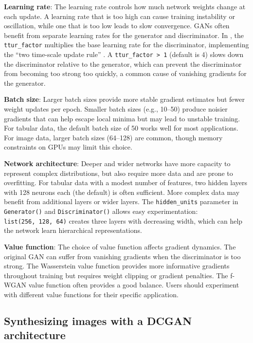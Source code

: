 \textbf{Learning rate}: The learning rate controls how much network weights change at each update. A learning rate that is too high can cause training instability or oscillation, while one that is too low leads to slow convergence. GANs often benefit from separate learning rates for the generator and discriminator. In , the \texttt{ttur\_factor} multiplies the base learning rate for the discriminator, implementing the ``two time-scale update rule'' \citep{heusel2017}. A \texttt{ttur\_factor\ \textgreater{}\ 1} (default is 4) slows down the discriminator relative to the generator, which can prevent the discriminator from becoming too strong too quickly, a common cause of vanishing gradients for the generator.

\textbf{Batch size}: Larger batch sizes provide more stable gradient estimates but fewer weight updates per epoch. Smaller batch sizes (e.g., 10--50) produce noisier gradients that can help escape local minima but may lead to unstable training. For tabular data, the default batch size of 50 works well for most applications. For image data, larger batch sizes (64--128) are common, though memory constraints on GPUs may limit this choice.

\textbf{Network architecture}: Deeper and wider networks have more capacity to represent complex distributions, but also require more data and are prone to overfitting. For tabular data with a modest number of features, two hidden layers with 128 neurons each (the  default) is often sufficient. More complex data may benefit from additional layers or wider layers. The \texttt{hidden\_units} parameter in \texttt{Generator()} and \texttt{Discriminator()} allows easy experimentation: \texttt{list(256,\ 128,\ 64)} creates three layers with decreasing width, which can help the network learn hierarchical representations.

\textbf{Value function}: The choice of value function affects gradient dynamics. The original GAN can suffer from vanishing gradients when the discriminator is too strong. The Wasserstein value function provides more informative gradients throughout training but requires weight clipping or gradient penalties. The f-WGAN value function often provides a good balance. Users should experiment with different value functions for their specific application.

\subsection{Synthesizing images with a DCGAN architecture}\label{sec:image_data}

